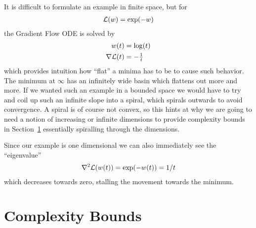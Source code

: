 It is difficult to formulate an example in finite space, but for
%
\begin{align*}
	\mathcal{L}(w) = \exp(-w)
\end{align*}
%
the Gradient Flow ODE is solved by
%
\begin{align*}
	w(t) &= \log(t)\\
	\nabla \mathcal{L}(t) &= -\tfrac1t
\end{align*}
%
which provides intuition how ``flat'' a minima has to be to cause such behavior.
The minimum at \(\infty\) has an infinitely wide basin which flattens out
more and more. If we wanted such an example in a bounded space we would have
to try and coil up such an infinite slope into a spiral, which spirals outwards
to avoid convergence. A spiral is of course not convex, so this hints
at why we are going to need a notion of increasing or infinite dimensions to
provide complexity bounds in Section~\ref{sec: complexity bounds} essentially
spiralling through the dimensions.

Since our example is one dimensional we can also immediately see the ``eigenvalue''
%
\begin{align*}
	\nabla^2 \mathcal{L}(w(t)) = \exp(-w(t)) = 1/t
\end{align*}
%
which decreases towards zero, stalling the movement towards the minimum.



\section{Complexity Bounds}\label{sec: complexity bounds}

